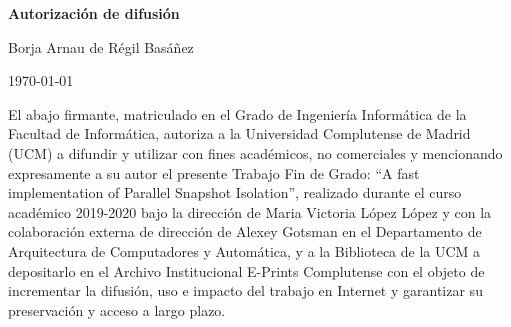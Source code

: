
\newpage

\thispagestyle{empty}

\begin{center}

{\bf \Huge Autorización de difusión}

\vspace{1cm}


   \large Borja Arnau de Régil Basáñez\\

   \vspace{0.5cm}


   \today\\

   \vspace{0.5cm}
   \end{center}

El abajo firmante, matriculado en el Grado de Ingeniería Informática de la Facultad de Informática, autoriza a la Universidad Complutense de Madrid (UCM) a difundir y utilizar con fines académicos, no comerciales y mencionando expresamente a su autor el presente Trabajo Fin de Grado: ``A fast implementation of Parallel Snapshot Isolation'', realizado durante el curso académico 2019-2020 bajo la dirección de Maria Victoria López López y con la colaboración externa de dirección de Alexey Gotsman en el Departamento de Arquitectura de Computadores y Automática, y a la Biblioteca de la UCM a depositarlo en el Archivo Institucional E-Prints Complutense con el objeto de incrementar la difusión, uso e impacto del trabajo en Internet y garantizar su preservación y acceso a largo plazo.

